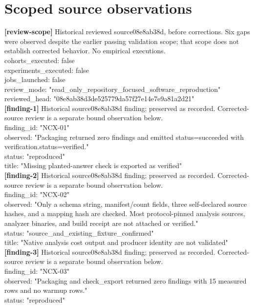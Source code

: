 \documentclass[11pt]{article}
\begin{document}
\section*{Scoped source observations}
\textbf{[review-scope]} Historical reviewed source08e8ab38d, before corrections. Six gaps were observed despite the earlier passing validation scope; that scope does not establish corrected behavior. No empirical executions.\\
cohorts\_executed: false\\
experiments\_executed: false\\
jobs\_launched: false\\
review\_mode: "read\_only\_repository\_focused\_software\_reproduction"\\
reviewed\_head: "08e8ab38d3de525779da57f27e14e7e9a81a2d21"\\
\textbf{[finding-1]} Historical source08e8ab38d finding; preserved as recorded. Corrected-source review is a separate bound observation below.\\
finding\_id: "NCX-01"\\
observed: "Packaging returned zero findings and emitted status=succeeded with verification.status=verified."\\
status: "reproduced"\\
title: "Missing planted-answer check is exported as verified"\\
\textbf{[finding-2]} Historical source08e8ab38d finding; preserved as recorded. Corrected-source review is a separate bound observation below.\\
finding\_id: "NCX-02"\\
observed: "Only a schema string, manifest/count fields, three self-declared source hashes, and a mapping hash are checked. Most protocol-pinned analysis sources, analyzer binaries, and build receipt are not attached or verified."\\
status: "source\_and\_existing\_fixture\_confirmed"\\
title: "Native analysis cost output and producer identity are not validated"\\
\textbf{[finding-3]} Historical source08e8ab38d finding; preserved as recorded. Corrected-source review is a separate bound observation below.\\
finding\_id: "NCX-03"\\
observed: "Packaging and check\_export returned zero findings with 15 measured rows and no warmup rows."\\
status: "reproduced"\\
\end{document}
